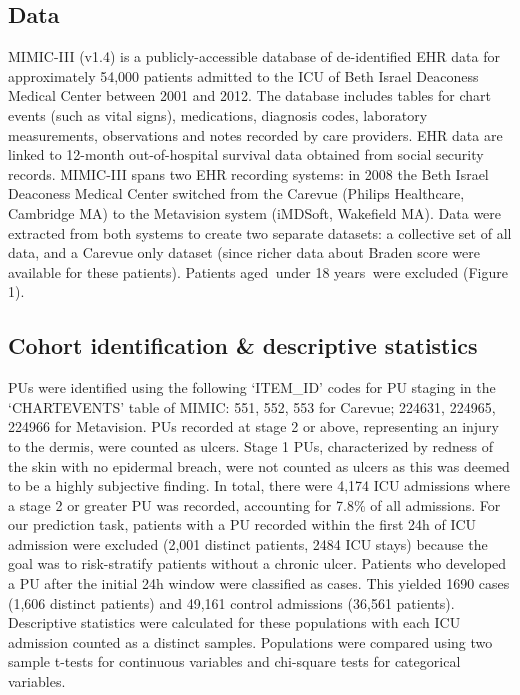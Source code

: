 \documentclass{ws-procs11x85}
\begin{document}
\subsection{Data}
MIMIC-III (v1.4) is a publicly-accessible database of de-identified EHR data for approximately 54,000 patients admitted to the ICU of Beth Israel Deaconess Medical Center between 2001 and 2012\cite{mimic}. The database includes tables for chart events (such as vital signs), medications, diagnosis codes, laboratory measurements, observations and notes recorded by care providers. EHR data are linked to 12-month out-of-hospital survival data obtained from social security records. MIMIC-III spans two EHR recording systems: in 2008 the Beth Israel Deaconess Medical Center switched from the Carevue (Philips Healthcare, Cambridge MA) to the Metavision system (iMDSoft, Wakefield MA). Data were extracted from both systems to create two separate datasets: a collective set of all data, and a Carevue only dataset (since richer data about Braden score were available for these patients). Patients aged  under 18 years  were excluded (Figure 1). 

\subsection{Cohort identification \& descriptive statistics}
PUs were identified using the following `ITEM\_ID' codes for PU staging in the `CHARTEVENTS' table of MIMIC: 551, 552, 553 for Carevue; 224631, 224965, 224966 for Metavision. PUs recorded at stage 2 or above, representing an injury to the dermis, were counted as ulcers. Stage 1 PUs, characterized by redness of the skin with no epidermal breach, were not counted as ulcers as this was deemed to be a highly subjective finding. In total, there were 4,174 ICU admissions where a stage 2 or greater PU was recorded, accounting for 7.8\% of all admissions. For our prediction task, patients with a PU recorded within the first 24h of ICU admission were excluded (2,001 distinct patients, 2484 ICU stays) because the goal was to risk-stratify patients without a chronic ulcer. Patients who developed a PU after the initial 24h window were classified as cases. This yielded 1690 cases (1,606 distinct patients) and 49,161 control admissions (36,561 patients). Descriptive statistics were calculated for these populations with each ICU admission counted as a distinct samples. Populations were compared using two sample t-tests for continuous variables and chi-square tests for categorical variables.
\end{document}
